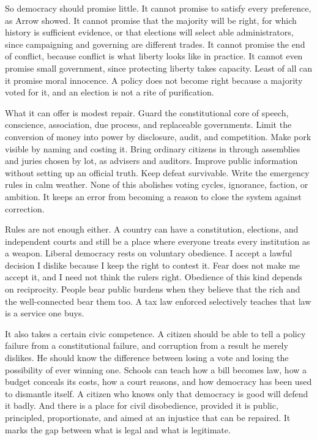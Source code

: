 \documentclass[12pt,a4paper]{book}
\begin{document}
So democracy should promise little. It cannot promise to satisfy every preference, as Arrow showed. It cannot promise that the majority will be right, for which history is sufficient evidence, or that elections will select able administrators, since campaigning and governing are different trades. It cannot promise the end of conflict, because conflict is what liberty looks like in practice. It cannot even promise small government, since protecting liberty takes capacity. Least of all can it promise moral innocence. A policy does not become right because a majority voted for it, and an election is not a rite of purification.

What it can offer is modest repair. Guard the constitutional core of speech, conscience, association, due process, and replaceable governments. Limit the conversion of money into power by disclosure, audit, and competition. Make pork visible by naming and costing it. Bring ordinary citizens in through assemblies and juries chosen by lot, as advisers and auditors. Improve public information without setting up an official truth. Keep defeat survivable. Write the emergency rules in calm weather. None of this abolishes voting cycles, ignorance, faction, or ambition. It keeps an error from becoming a reason to close the system against correction.

Rules are not enough either. A country can have a constitution, elections, and independent courts and still be a place where everyone treats every institution as a weapon. Liberal democracy rests on voluntary obedience. I accept a lawful decision I dislike because I keep the right to contest it. Fear does not make me accept it, and I need not think the rulers right. Obedience of this kind depends on reciprocity. People bear public burdens when they believe that the rich and the well-connected bear them too. A tax law enforced selectively teaches that law is a service one buys.

It also takes a certain civic competence. A citizen should be able to tell a policy failure from a constitutional failure, and corruption from a result he merely dislikes. He should know the difference between losing a vote and losing the possibility of ever winning one. Schools can teach how a bill becomes law, how a budget conceals its costs, how a court reasons, and how democracy has been used to dismantle itself. A citizen who knows only that democracy is good will defend it badly. And there is a place for civil disobedience, provided it is public, principled, proportionate, and aimed at an injustice that can be repaired. It marks the gap between what is legal and what is legitimate.
\end{document}
